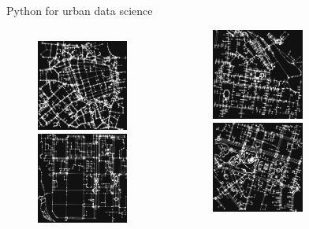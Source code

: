 \documentclass{beamer}
\begin{document}
\begin{frame}{Python for urban data science}
\begin{figure}

\begin{columns}[t]

\centering

\includegraphics[width=3cm,height=3cm]{images/Kyiv1km_streets.png}
\includegraphics[width=3cm,height=3cm]{images/Odesa1km_streets.png}
\begin{center}

\includegraphics[width=3cm,height=3cm]{images/Lviv1km_streets.png}

\includegraphics[height=3cm]{images/Donetsk1km_streets.png}
\end{center}

\end{columns}
\end{figure}
\end{frame}
\end{document}
